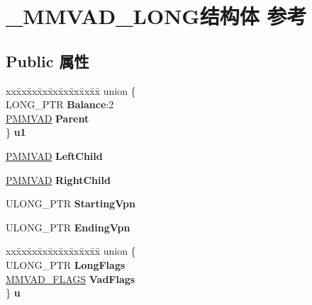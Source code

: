 \hypertarget{struct___m_m_v_a_d___l_o_n_g}{}\section{\+\_\+\+M\+M\+V\+A\+D\+\_\+\+L\+O\+N\+G结构体 参考}
\label{struct___m_m_v_a_d___l_o_n_g}
\subsection*{Public 属性}
\begin{DoxyCompactItemize}
\item 
\mbox{\label{struct___m_m_v_a_d___l_o_n_g_a24c04a876464f48feb227685198e5d68}} 
\begin{tabbing}
xx\=xx\=xx\=xx\=xx\=xx\=xx\=xx\=xx\=\kill
union \{\\
\>LONG\_PTR {\bfseries Balance}:2\\
\>\hyperlink{struct___m_m_v_a_d}{PMMVAD} {\bfseries Parent}\\
\} {\bfseries u1}\\

\end{tabbing}\item 
\mbox{\label{struct___m_m_v_a_d___l_o_n_g_af7d1c33bf19f28ffafc3af0799e08daf}} 
\hyperlink{struct___m_m_v_a_d}{P\+M\+M\+V\+AD} {\bfseries Left\+Child}
\item 
\mbox{\label{struct___m_m_v_a_d___l_o_n_g_a77f491ee7e9c7985297839f69daacb82}} 
\hyperlink{struct___m_m_v_a_d}{P\+M\+M\+V\+AD} {\bfseries Right\+Child}
\item 
\mbox{\label{struct___m_m_v_a_d___l_o_n_g_afe6e1aab9d3bd7395fc2d0c90753d236}} 
U\+L\+O\+N\+G\+\_\+\+P\+TR {\bfseries Starting\+Vpn}
\item 
\mbox{\label{struct___m_m_v_a_d___l_o_n_g_a941c2324e7cedfb13843cb66753df308}} 
U\+L\+O\+N\+G\+\_\+\+P\+TR {\bfseries Ending\+Vpn}
\item 
\mbox{\label{struct___m_m_v_a_d___l_o_n_g_ab2332114999d9b499e9af1703fc906ab}} 
\begin{tabbing}
xx\=xx\=xx\=xx\=xx\=xx\=xx\=xx\=xx\=\kill
union \{\\
\>ULONG\_PTR {\bfseries LongFlags}\\
\>\hyperlink{struct___m_m_v_a_d___f_l_a_g_s}{MMVAD\_FLAGS} {\bfseries VadFlags}\\
\} {\bfseries u}\\


\end{tabbing}
\end{DoxyCompactItemize}
